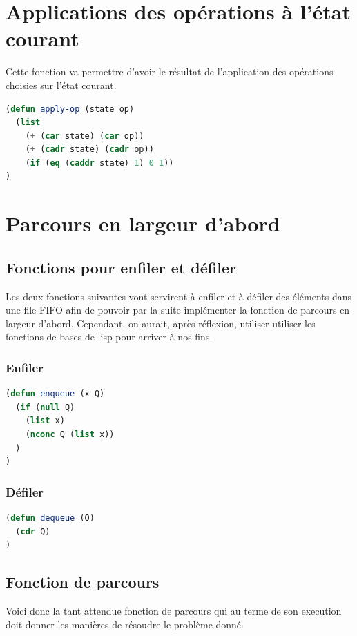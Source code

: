 \documentclass[a4paper, 12pt, leqno]{report}
\theoremstyle{plain}
\begin{document}
            \section{Applications des opérations à l'état courant}
            Cette fonction va permettre d'avoir le résultat de l'application des opérations choisies sur l'état courant.
            \begin{lstlisting}[label=some-code,caption=apply-op (state op) ,language=lisp]
(defun apply-op (state op)
  (list 
    (+ (car state) (car op)) 
    (+ (cadr state) (cadr op)) 
    (if (eq (caddr state) 1) 0 1))
)
            \end{lstlisting}
            
            \newpage
            
            \section{Parcours en largeur d'abord} 
            \subsection{Fonctions pour enfiler et défiler}
            Les deux fonctions suivantes vont servirent à enfiler et à défiler des éléments dans une file FIFO afin de pouvoir par la suite implémenter la fonction de parcours en largeur d'abord. Cependant, on aurait, après réflexion, utiliser utiliser les fonctions de bases de lisp pour arriver à nos fins.
            \subsubsection{Enfiler}
            \begin{lstlisting}[label=some-code,caption=enqueue (x Q) ,language=lisp]
(defun enqueue (x Q)
  (if (null Q)
    (list x)
	(nconc Q (list x))
  )
)
            \end{lstlisting}
            \subsubsection{Défiler}
            \begin{lstlisting}[label=some-code,caption=dequeue (Q) ,language=lisp]
(defun dequeue (Q)
  (cdr Q)
)
            \end{lstlisting}
            
            \subsection{Fonction de parcours}
            Voici donc la tant attendue fonction de parcours qui au terme de son execution doit donner les manières de résoudre le problème donné.
\end{document}
